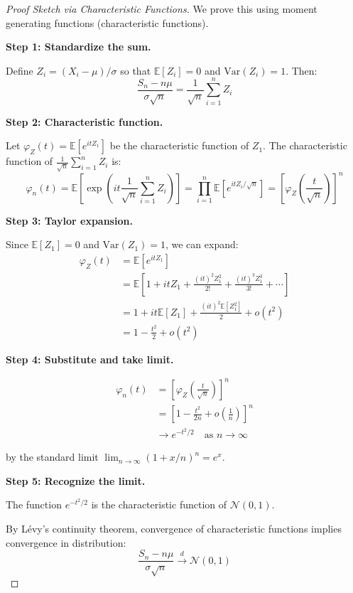 \begin{proof}[Proof Sketch via Characteristic Functions]
We prove this using moment generating functions (characteristic functions).

\textbf{Step 1: Standardize the sum.}

Define $Z_i = (X_i - \mu)/\sigma$ so that $\mathbb{E}[Z_i] = 0$ and $\text{Var}(Z_i) = 1$. Then:
\begin{equation}
\frac{S_n - n\mu}{\sigma\sqrt{n}} = \frac{1}{\sqrt{n}}\sum_{i=1}^n Z_i
\end{equation}

\textbf{Step 2: Characteristic function.}

Let $\varphi_Z(t) = \mathbb{E}[e^{itZ_1}]$ be the characteristic function of $Z_1$. The characteristic function of $\frac{1}{\sqrt{n}}\sum_{i=1}^n Z_i$ is:
\begin{equation}
\varphi_n(t) = \mathbb{E}\left[\exp\left(it\frac{1}{\sqrt{n}}\sum_{i=1}^n Z_i\right)\right] = \prod_{i=1}^n \mathbb{E}\left[e^{itZ_i/\sqrt{n}}\right] = \left[\varphi_Z\left(\frac{t}{\sqrt{n}}\right)\right]^n
\end{equation}

\textbf{Step 3: Taylor expansion.}

Since $\mathbb{E}[Z_1] = 0$ and $\text{Var}(Z_1) = 1$, we can expand:
\begin{align}
\varphi_Z(t) &= \mathbb{E}[e^{itZ_1}] \\
&= \mathbb{E}\left[1 + itZ_1 + \frac{(it)^2Z_1^2}{2!} + \frac{(it)^3Z_1^3}{3!} + \cdots\right] \\
&= 1 + it\mathbb{E}[Z_1] + \frac{(it)^2\mathbb{E}[Z_1^2]}{2} + o(t^2) \\
&= 1 - \frac{t^2}{2} + o(t^2)
\end{align}

\textbf{Step 4: Substitute and take limit.}

\begin{align}
\varphi_n(t) &= \left[\varphi_Z\left(\frac{t}{\sqrt{n}}\right)\right]^n \\
&= \left[1 - \frac{t^2}{2n} + o\left(\frac{1}{n}\right)\right]^n \\
&\to e^{-t^2/2} \quad \text{as } n \to \infty
\end{align}

by the standard limit $\lim_{n\to\infty}(1 + x/n)^n = e^x$.

\textbf{Step 5: Recognize the limit.}

The function $e^{-t^2/2}$ is the characteristic function of $\mathcal{N}(0,1)$.

By Lévy's continuity theorem, convergence of characteristic functions implies convergence in distribution:
\begin{equation}
\frac{S_n - n\mu}{\sigma\sqrt{n}} \xrightarrow{d} \mathcal{N}(0, 1)
\end{equation}
\end{proof}

